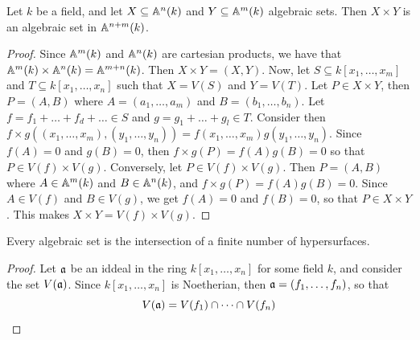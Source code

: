 \begin{lemma}\label{1.2.4}
    Let $k$ be a field, and let  $X \subseteq \mathbb{A}^n(k)$ and $Y \subseteq \mathbb{A}^m(k)$
    algebraic sets. Then $X \times Y$ is an algebraic set in  $\mathbb{A}^{n+m}(k)$.
\end{lemma}
\begin{proof}
    Since $\mathbb{A}^m(k)$ and $\mathbb{A}^n(k)$ are cartesian products, we have that $\mathbb{A}^m(k)
    \times \mathbb{A}^n(k)=\mathbb{A}^{m+n}(k)$. Then $X \times Y=(X,Y)$. Now, let $S \subseteq
    k[x_1, \dots, x_m]$ and $T \subseteq k[x_1, \dots,x_n]$ such that $X=V(S)$
    and $Y=V(T)$. Let $P \in X \times Y$, then  $P=(A,B)$ where $A=(a_1, \dots,
    a_m)$ and $B=(b_1, \dots, b_n)$.  Let $f=f_1+\dots+f_d+\dots \in S$ and
    $g=g_1+\dots+g_l \in T$. Consider then $f \times
    g((x_1, \dots, x_m),(y_1, \dots, y_n))=f(x_1, \dots, x_m)g(y_1, \dots,
    y_n)$. Since $f(A)=0$ and $g(B)=0$, then $f \times g(P)=f(A)g(B)=0$ so that
    $P \in V(f) \times V(g)$. Conversely, let $P \in V(f) \times V(g)$. Then
    $P=(A,B)$ where $A \in \mathbb{A}^m(k)$ and $B \in \mathbb{A}^n(k)$, and $f \times
    g(P)=f(A)g(B)=0$. Since  $A \in V(f)$ and $B \in V(g)$, we get $f(A)=0$ and
    $f(B)=0$, so that $P \in X \times Y$. This makes  $X \times Y=V(f) \times
    V(g)$.
\end{proof}

\begin{theorem}\label{theorem_9.5.1}
  Every algebraic set is the intersection of a finite number of
  hypersurfaces.
\end{theorem}
\begin{proof}
  Let $\mathfrak{a}$ be an iddeal in the ring $k[x_1, \dots, x_n]$ for some field $k$,
  and consider the set $V(\mathfrak{a})$. Since $k[x_1, \dots, x_n]$ is Noetherian,
  then $\mathfrak{a}=(f_1, \dots, f_n)$, so that
  \begin{equation*}
    V(\mathfrak{a})=V(f_1) \cap \dots \cap V(f_n)
  \end{equation*}
\end{proof}
